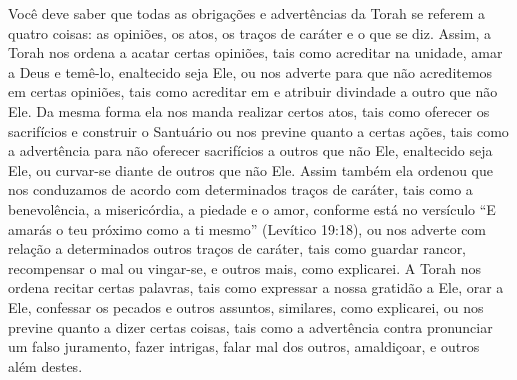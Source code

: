 Você deve saber que todas as obrigações e advertências da Torah se
referem a quatro coisas: as opiniões, os atos, os traços de caráter e o
que se diz. Assim, a Torah nos ordena a acatar certas opiniões, tais
como acreditar na unidade, amar a Deus e temê-lo, enaltecido seja Ele,
ou nos adverte para que não acreditemos em certas opiniões, tais como
acreditar em e atribuir divindade a outro que não Ele. Da mesma forma
ela nos manda realizar certos atos, tais como oferecer os sacrifícios e
construir o Santuário ou nos previne quanto a certas ações, tais como a
advertência para não oferecer sacrifícios a outros que não Ele,
enaltecido seja Ele, ou curvar-se diante de outros que não Ele. Assim
também ela ordenou que nos conduzamos de acordo com determinados traços
de caráter, tais como a benevolência, a misericórdia, a piedade e o
amor, conforme está no versículo ``E amarás o teu próximo como a ti
mesmo'' (Levítico 19:18), ou nos adverte com relação a determinados
outros traços de caráter, tais como guardar rancor, recompensar o mal
ou vingar-se, e outros mais, como explicarei. A Torah nos ordena recitar
certas palavras, tais como expressar a nossa gratidão a Ele, orar a
Ele, confessar os pecados e outros assuntos,
similares, como explicarei, ou nos previne quanto a dizer certas coisas,
tais como a advertência contra pronunciar um falso juramento, fazer
intrigas, falar mal dos outros, amaldiçoar, e outros além destes.

